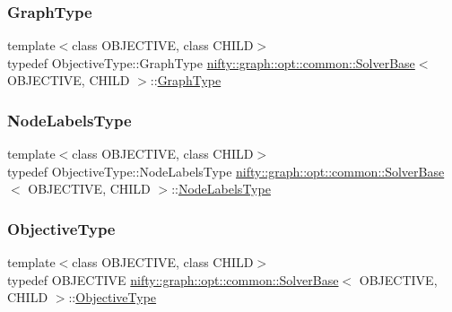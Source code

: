 \subsubsection{\texorpdfstring{Graph\+Type}{GraphType}}
{\footnotesize\ttfamily template$<$class O\+B\+J\+E\+C\+T\+I\+VE, class C\+H\+I\+LD$>$ \\
typedef Objective\+Type\+::\+Graph\+Type \hyperlink{classnifty_1_1graph_1_1opt_1_1common_1_1SolverBase}{nifty\+::graph\+::opt\+::common\+::\+Solver\+Base}$<$ O\+B\+J\+E\+C\+T\+I\+VE, C\+H\+I\+LD $>$\+::\hyperlink{classnifty_1_1graph_1_1opt_1_1common_1_1SolverBase_abd7237c59d5ba5bf2d4c9c0eca8a248b}{Graph\+Type}}

\mbox{\label{classnifty_1_1graph_1_1opt_1_1common_1_1SolverBase_abefd51561de2fd009f6bed6bef6009ea}} 
\subsubsection{\texorpdfstring{Node\+Labels\+Type}{NodeLabelsType}}
{\footnotesize\ttfamily template$<$class O\+B\+J\+E\+C\+T\+I\+VE, class C\+H\+I\+LD$>$ \\
typedef Objective\+Type\+::\+Node\+Labels\+Type \hyperlink{classnifty_1_1graph_1_1opt_1_1common_1_1SolverBase}{nifty\+::graph\+::opt\+::common\+::\+Solver\+Base}$<$ O\+B\+J\+E\+C\+T\+I\+VE, C\+H\+I\+LD $>$\+::\hyperlink{classnifty_1_1graph_1_1opt_1_1common_1_1SolverBase_abefd51561de2fd009f6bed6bef6009ea}{Node\+Labels\+Type}}

\mbox{\label{classnifty_1_1graph_1_1opt_1_1common_1_1SolverBase_aac4861a6201ba3df7ef66ad5af0c65bd}} 
\subsubsection{\texorpdfstring{Objective\+Type}{ObjectiveType}}
{\footnotesize\ttfamily template$<$class O\+B\+J\+E\+C\+T\+I\+VE, class C\+H\+I\+LD$>$ \\
typedef O\+B\+J\+E\+C\+T\+I\+VE \hyperlink{classnifty_1_1graph_1_1opt_1_1common_1_1SolverBase}{nifty\+::graph\+::opt\+::common\+::\+Solver\+Base}$<$ O\+B\+J\+E\+C\+T\+I\+VE, C\+H\+I\+LD $>$\+::\hyperlink{classnifty_1_1graph_1_1opt_1_1common_1_1SolverBase_aac4861a6201ba3df7ef66ad5af0c65bd}{Objective\+Type}}

